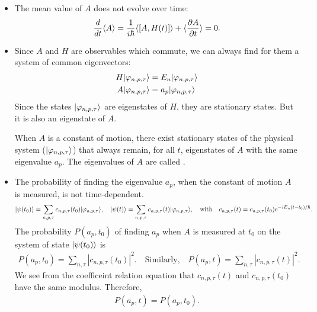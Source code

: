 \begin{itemize}[itemsep=0pt,topsep=0pt]
    \item The mean value of $A$ does not evolve over time:
    \begin{align*}
        \frac{d}{dt}\langle A\rangle=\frac{1}{i\hbar}\langle[A,H(t)]\rangle+\langle\frac{\partial A}{\partial t}\rangle=0.
    \end{align*}
    \item Since $A$ and $H$ are observables which commute, we can always find for them a system of common eigenvectors:
    \begin{align*}
        H|\varphi_{n,p,\tau}\rangle&=E_n|\varphi_{n,p,\tau}\rangle\\
        A|\varphi_{n,p,\tau}\rangle&=a_p|\varphi_{n,p,\tau}\rangle
    \end{align*}
    Since the states $|\varphi_{n,p,\tau}\rangle$ are eigenstates of $H$, they are stationary states. But it is also an eigenstate of $A$.
    \begin{emphasizer}
        When $A$ is a constant of motion, there exist stationary states of the physical system ($|\varphi_{n,p,\tau}\rangle$) that always remain, for all $t$, eigenstates of $A$ with the same 
        eigenvalue $a_p$. The eigenvalues of $A$ are called .
    \end{emphasizer}
    \item The probability of finding the eigenvalue $a_p$, when the constant of motion $A$ is measured, is not time-dependent.
    \begin{align*}
        |\psi(t_0)\rangle=\sum_{n,p,\tau}c_{n,p,\tau}(t_0)|\varphi_{n,p,\tau}\rangle,\quad|\psi(t)\rangle=\sum_{n,p,\tau}c_{n,p,\tau}(t)|\varphi_{n,p,\tau}\rangle,\quad\text{with}\quad
        c_{n,p,\tau}(t)=c_{n,p,\tau}(t_0)e^{-iE_n(t-t_0)/\hbar}.
    \end{align*}
    The probability $P(a_p,t_0)$ of finding $a_p$ when $A$ is measured at $t_0$ on the system of state $|\psi(t_0)\rangle$ is 
    \begin{align*}
        P(a_p,t_0)=\sum_{n,\tau}|c_{n,p,\tau}(t_0)|^2.\quad\text{Similarly,}\quad P(a_p,t)=\sum_{n,\tau}|c_{n,p,\tau}(t)|^2.
    \end{align*}
    We see from the coefficeint relation equation that $c_{n,p,\tau}(t)$ and $c_{n,p,\tau}(t_0)$ have the same modulus. Therefore,
    \begin{align}
        P(a_p,t)=P(a_p,t_0).
    \end{align}
\end{itemize}


